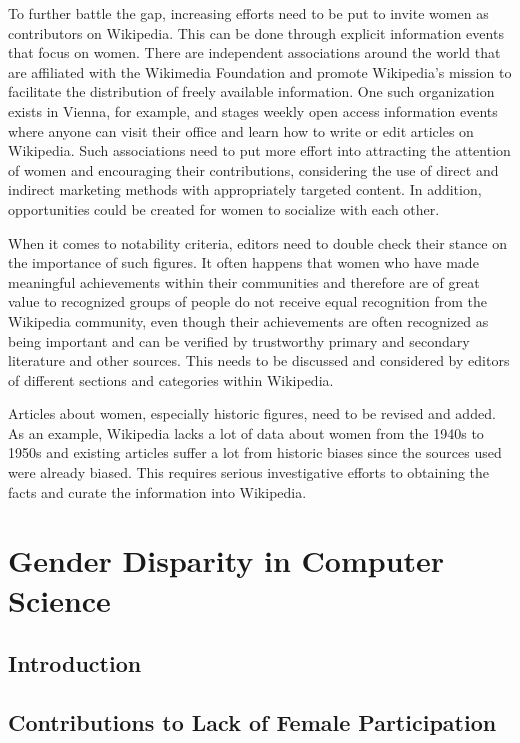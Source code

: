 \documentclass[a4paper, 11pt]{article}
\begin{document}
To further battle the gap, increasing efforts need to be put to invite women as contributors on Wikipedia. This can be done through explicit information events that focus on women. There are independent associations around the world that are affiliated with the Wikimedia Foundation and promote Wikipedia's mission to facilitate the distribution of freely available information. One such organization exists in Vienna, for example, and stages weekly open access information events where anyone can visit their office and learn how to write or edit articles on Wikipedia. Such associations need to put more effort into attracting the attention of women and encouraging their contributions, considering the use of direct and indirect marketing methods with appropriately targeted content. In addition, opportunities could be created for women to socialize with each other.

When it comes to notability criteria, editors need to double check their stance on the importance of such figures. It often happens that women who have made meaningful achievements within their communities and therefore are of great value to recognized groups of people do not receive equal recognition from the Wikipedia community, even though their achievements are often recognized as being important and can be verified by trustworthy primary and secondary literature and other sources. This needs to be discussed and considered by editors of different sections and categories within Wikipedia.

Articles about women, especially historic figures, need to be revised and added. As an example, Wikipedia lacks a lot of data about women from the 1940s to 1950s and existing articles suffer a lot from historic biases since the sources used were already biased. This requires serious investigative efforts to obtaining the facts and curate the information into Wikipedia.



\section{Gender Disparity in Computer Science} \label{sec:gender-disparity}

\subsection{Introduction} \label{sec:gender-disparity:introduction}

\subsection{Contributions to Lack of Female Participation} \label{sec:gender-disparity:contributions}
\end{document}
